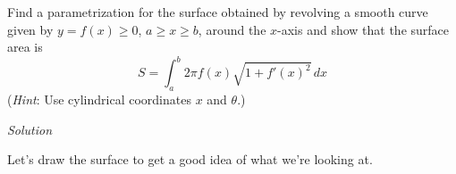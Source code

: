 \documentclass{article}
\newcommand{\Solution}{\textit{Solution}}
\begin{document}
Find a parametrization for the surface obtained by revolving a smooth curve given
by $y = f(x) \geq0$, $a \geq x \geq b$, around the $x$-axis and show that the surface area is
\begin{equation*}
    S=\int_a^b 2\pi f(x)\sqrt{1+f'(x)^2}\,dx
\end{equation*}
(\textit{Hint}: Use cylindrical coordinates $x$ and $\theta$.)

\Solution

Let's draw the surface to get a good idea of what we're looking at.

\begin{tikzpicture}[x=0.75pt,y=0.75pt,yscale=-1,xscale=1]


\end{tikzpicture}
\end{document}
